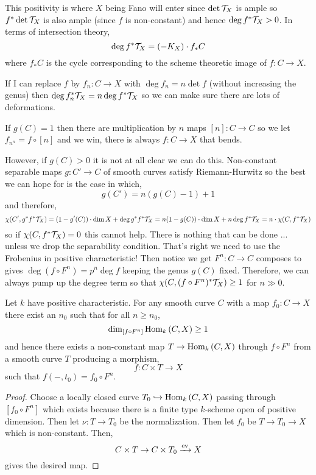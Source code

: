 \documentclass[12pt]{article}
\begin{document}
\begin{rmk}
This positivity is where $X$ being Fano will enter since $\det{\mathcal{T}_X}$ is ample so $f^* \det{\mathcal{T}_X}$ is also ample (since $f$ is non-constant) and hence $\deg{f^* \mathcal{T}_X} > 0$.
In terms of intersection theory,
\[ \deg{f^* \mathcal{T}_X} = (-K_X) \cdot f_* C \]
where $f_* C$ is the cycle corresponding to the scheme theoretic image of $f : C \to X$.
\end{rmk}
\noindent
If I can replace $f$ by $f_n : C \to X$ with $\deg{f_n} = n \det{f}$ (without increasing the genus) then $\deg{f_n^* \mathcal{T}_X} = n \deg{f^* \mathcal{T}_X}$ so we can make sure there are lots of deformations.

\begin{example}
If $g(C) = 1$ then there are multiplication by $n$ maps $[n] : C \to C$ so we let $f_{n^n} = f \circ [n]$ and we win, there is always $f : C \to X$ that bends.
\end{example}
\noindent
However, if $g(C) > 0$ it is not at all clear we can do this. Non-constant separable maps $g : C' \to C$ of smooth curves satisfy Riemann-Hurwitz so the best we can hope for is the \etale case in which,
\[ g(C') = n(g(C) - 1) + 1 \]
and therefore,
\[ \chi(C', g^* f^* \mathcal{T}_X) = (1 - g'(C)) \cdot \dim{X} + \deg{g^* f^* \mathcal{T}_X} = n (1 - g(C)) \cdot \dim{X} + n \deg{f^* \mathcal{T}_X} = n \cdot \chi(C, f^* \mathcal{T}_X) \]
so if $\chi(C, f^* \mathcal{T}_X) = 0$ this cannot help. There is nothing that can be done ... unless we drop the separability condition. That's right we need to use the Frobenius in positive characteristic! Then notice we get $F^n : C \to C$ composes to gives $\deg{(f \circ F^n)} = p^n \deg{f}$ keeping the genus $g(C)$ fixed. Therefore, we can always pump up the degree term so that $\chi(C, (f \circ F^n)^* \mathcal{T}_X) \ge 1$ for $n \gg 0$.

\begin{prop}
Let $k$ have positive characteristic. For any smooth curve $C$ with a map $f_0 : C \to X$ there exist an $n_0$ such that for all $n \ge n_0$,
\[ \dim_{[f \circ F^n]} \mathrm{Hom}_{k} \left( C, X \right) \ge 1 \]
and hence there exists a non-constant map $T \to \mathrm{Hom}_{k} \left( C, X \right)$ through $f \circ F^n$ from a smooth curve $T$ producing a morphism,
\[ f : C \times T \to X \]
such that $f(-,t_0) = f_0 \circ F^n$. 
\end{prop}

\begin{proof}
Choose a locally closed curve $T_0 \hookrightarrow \mathrm{Hom}_{k} \left( C, X \right)$ passing through $[f_0 \circ F^n]$ which exists because there is a finite type $k$-scheme open of positive dimension. Then let $\nu : T \to T_0$ be the normalization. Then let $f_0$ be $T \to T_0 \to X$ which is non-constant. Then,
\[ C \times T \to C \times T_0 \xrightarrow{\mathrm{ev}} X \]
gives the desired map.
\end{proof}
\end{document}

